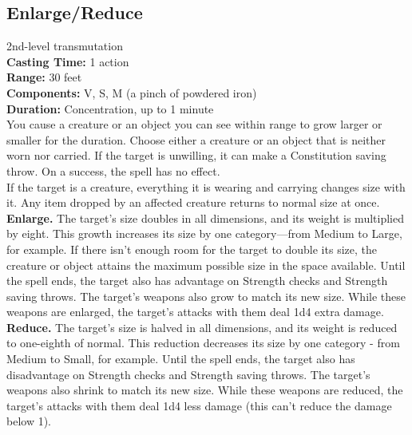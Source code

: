 \documentclass[11pt, A4paper, english]{article}
\begin{document}
		\subsection{Enlarge/Reduce}
2nd-level transmutation \\
\textbf{Casting Time:} 1 action \\
\textbf{Range:} 30 feet \\
\textbf{Components:} V, S, M (a pinch of powdered iron) \\
\textbf{Duration:} Concentration, up to 1 minute \\
You cause a creature or an object you can see within range to grow larger or smaller for the duration. Choose either a creature or an object that is neither worn nor carried. If the target is unwilling, it can make a Constitution saving throw. On a success, the spell has no effect. \\
If the target is a creature, everything it is wearing and carrying changes size with it. Any item dropped by an affected creature returns to normal size at once. \\
\textbf{Enlarge.} The target’s size doubles in all dimensions, and its weight is multiplied by eight. This growth increases its size by one category—from Medium to Large, for example. If there isn’t enough room for the target to double its size, the creature or object attains the maximum possible size in the space available. Until the spell ends, the target also has advantage on Strength checks and Strength saving throws. The target’s weapons also grow to match its new size. While these weapons are enlarged, the target’s attacks with them deal 1d4 extra damage. \\
\textbf{Reduce.} The target’s size is halved in all dimensions, and its weight is reduced to one-eighth of normal. This reduction decreases its size by one category - from Medium to Small, for example. Until the spell ends, the target also has disadvantage on Strength checks and Strength saving throws. The target’s weapons also shrink to match its new size. While these weapons are reduced, the target’s attacks with them deal 1d4 less damage (this can’t reduce the damage below 1).
\end{document}
